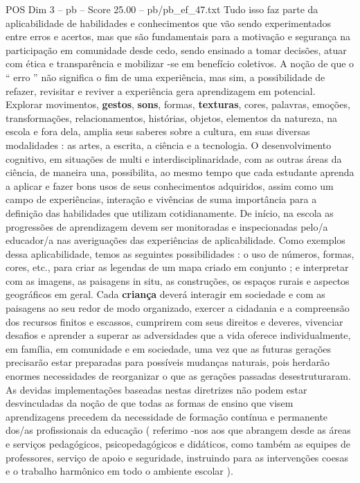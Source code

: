 \begin{textsample}{POS Dim 3 – pb – Score 25.00 – pb/pb\_ef\_47.txt}
Tudo isso faz parte da aplicabilidade de habilidades e conhecimentos que vão sendo experimentados entre erros e acertos, mas que são fundamentais para a motivação e segurança na participação em comunidade desde cedo, sendo ensinado a tomar decisões, atuar com ética e transparência e mobilizar -se em benefício coletivos.
A noção de que o “ erro ” não significa o fim de uma experiência, mas sim, a possibilidade de refazer, revisitar e reviver a experiência gera aprendizagem em potencial.
Explorar movimentos, \textbf{gestos}, \textbf{sons}, formas, \textbf{texturas}, cores, palavras, emoções, transformações, relacionamentos, histórias, objetos, elementos da natureza, na escola e fora dela, amplia seus saberes sobre a cultura, em suas diversas modalidades : as artes, a escrita, a ciência e a tecnologia.
O desenvolvimento cognitivo, em situações de multi e interdisciplinaridade, com as outras áreas da ciência, de maneira una, possibilita, ao mesmo tempo que cada estudante aprenda a aplicar e fazer bons usos de seus conhecimentos adquiridos, assim como um campo de experiências, interação e vivências de suma importância para a definição das habilidades que utilizam cotidianamente.
De início, na escola as progressões de aprendizagem devem ser monitoradas e inspecionadas pelo/a educador/a nas averiguações das experiências de aplicabilidade.
Como exemplos dessa aplicabilidade, temos as seguintes possibilidades : o uso de números, formas, cores, etc., para criar as legendas de um mapa criado em conjunto ; e interpretar com as imagens, as paisagens in situ, as construções, os espaços rurais e aspectos geográficos em geral.
Cada \textbf{criança} deverá interagir em sociedade e com as paisagens ao seu redor de modo organizado, exercer a cidadania e a compreensão dos recursos finitos e escassos, cumprirem com seus direitos e deveres, vivenciar desafios e aprender a superar as adversidades que a vida oferece individualmente, em família, em comunidade e em sociedade, uma vez que as futuras gerações precisarão estar preparadas para possíveis mudanças naturais, pois herdarão enormes necessidades de reorganizar o que as gerações passadas desestruturaram.
As devidas implementações baseadas nestas diretrizes não podem estar desvinculadas da noção de que todas as formas de ensino que visem aprendizagens precedem da necessidade de formação contínua e permanente dos/as profissionais da educação ( referimo -nos aos que abrangem desde as áreas e serviços pedagógicos, psicopedagógicos e didáticos, como também as equipes de professores, serviço de apoio e seguridade, instruindo para as intervenções coesas e o trabalho harmônico em todo o ambiente escolar ).

\end{textsample}
